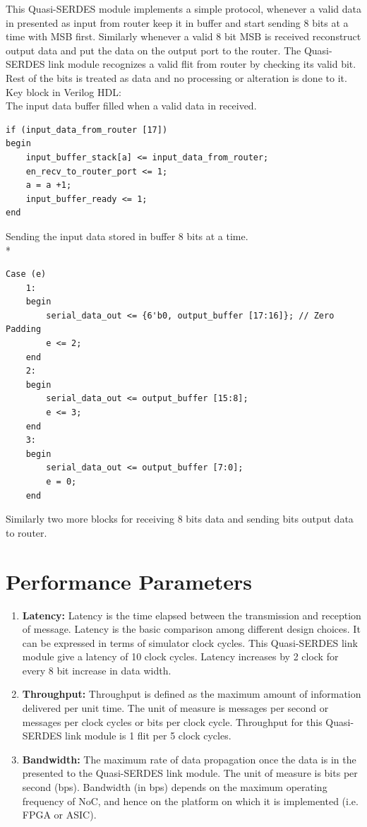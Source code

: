 This Quasi-SERDES module implements a simple protocol, whenever a valid data in presented as input from router keep it in buffer and start sending 8 bits at a time with MSB first. Similarly whenever a valid 8 bit MSB is received reconstruct output data and put the data on the output port to the router. The Quasi-SERDES link module recognizes a valid flit from router by checking its valid bit. Rest of the bits is treated as data and no processing or alteration is done to it.
\newpage
Key block in Verilog HDL: \\
The input data buffer filled when a valid data in received.
\begin{lstlisting}
if (input_data_from_router [17])
begin
	input_buffer_stack[a] <= input_data_from_router;
	en_recv_to_router_port <= 1;
	a = a +1;
	input_buffer_ready <= 1;
end
\end{lstlisting}

Sending the input data stored in buffer 8 bits at a time.\\*
\begin{lstlisting}
Case (e)
	1:
	begin	
		serial_data_out <= {6'b0, output_buffer [17:16]}; // Zero Padding
		e <= 2;
	end
	2:
	begin	
		serial_data_out <= output_buffer [15:8];
		e <= 3;
	end
	3:
	begin
		serial_data_out <= output_buffer [7:0];
		e = 0;
	end
\end{lstlisting}

Similarly two more blocks for receiving 8 bits data and sending  bits output data to router.



\section{Performance Parameters}
\begin{enumerate} 
	\item{\textbf{Latency:} Latency is the time elapsed between the transmission and reception of message. Latency is the basic comparison among different design choices. It can be expressed in terms of simulator clock cycles. This Quasi-SERDES link module give a latency of 10 clock cycles. Latency increases by 2 clock for every 8 bit increase in data width.}
	\item{\textbf{Throughput:} Throughput is defined as the maximum amount of information delivered per unit time. The unit of measure is messages per second or messages per clock cycles or bits per clock cycle. Throughput for this Quasi-SERDES link module is 1 flit per 5 clock cycles.}
	\item{\textbf{Bandwidth:} The maximum rate of data propagation once the data is in the presented to the Quasi-SERDES link module. The unit of measure is bits per second (bps). Bandwidth (in bps) depends on the maximum operating frequency of NoC, and hence on the platform on which it is implemented (i.e. FPGA or ASIC).}
\end{enumerate}

